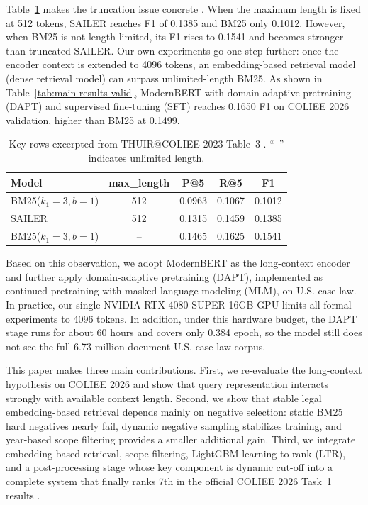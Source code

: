 Table~\ref{tab:thuir-table3-excerpt} makes the truncation issue concrete \cite{li2023thuir}. When the maximum length is fixed at 512 tokens, SAILER reaches F1 of 0.1385 and BM25 only 0.1012. However, when BM25 is not length-limited, its F1 rises to 0.1541 and becomes stronger than truncated SAILER. Our own experiments go one step further: once the encoder context is extended to 4096 tokens, an embedding-based retrieval model (dense retrieval model) can surpass unlimited-length BM25. As shown in Table~\ref{tab:main-results-valid}, ModernBERT with domain-adaptive pretraining (DAPT) and supervised fine-tuning (SFT) reaches 0.1650 F1 on COLIEE 2026 validation, higher than BM25 at 0.1499.

\begin{table}[t]
  \centering
  \small
  \begin{tabular}{lcccc}
    \toprule
    Model & max\_length & P@5 & R@5 & F1 \\
    \midrule
    BM25($k_1=3,b=1$) & 512 & 0.0963 & 0.1067 & 0.1012 \\
    SAILER & 512 & 0.1315 & 0.1459 & 0.1385 \\
    BM25($k_1=3,b=1$) & -- & 0.1465 & 0.1625 & 0.1541 \\
    \bottomrule
  \end{tabular}
  \caption{Key rows excerpted from THUIR@COLIEE 2023 Table~3 \cite{li2023thuir}. ``--'' indicates unlimited length.}
  \label{tab:thuir-table3-excerpt}
\end{table}

Based on this observation, we adopt ModernBERT \cite{warner2024modernbert} as the long-context encoder and further apply domain-adaptive pretraining (DAPT), implemented as continued pretraining with masked language modeling (MLM), on U.S. case law. In practice, our single NVIDIA RTX 4080 SUPER 16GB GPU limits all formal experiments to 4096 tokens. In addition, under this hardware budget, the DAPT stage runs for about 60 hours and covers only 0.384 epoch, so the model still does not see the full 6.73 million-document U.S. case-law corpus.

This paper makes three main contributions. First, we re-evaluate the long-context hypothesis on COLIEE 2026 and show that query representation interacts strongly with available context length. Second, we show that stable legal embedding-based retrieval depends mainly on negative selection: static BM25 hard negatives nearly fail, dynamic negative sampling stabilizes training, and year-based scope filtering provides a smaller additional gain. Third, we integrate embedding-based retrieval, scope filtering, LightGBM learning to rank (LTR), and a post-processing stage whose key component is dynamic cut-off into a complete system that finally ranks 7th in the official COLIEE 2026 Task~1 results \cite{coliee2026task1results}.
